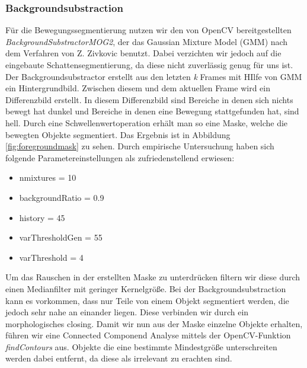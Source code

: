 \documentclass[conference]{IEEEtran}
\begin{document}
\subsubsection{Backgroundsubstraction}
Für die Bewegungssegmentierung nutzen wir den von OpenCV bereitgestellten \textit{BackgroundSubstractorMOG2}, der das Gaussian Mixture Model (GMM) nach dem Verfahren von Z. Zivkovic \cite{zivkovic} benutzt. Dabei verzichten wir jedoch auf die eingebaute Schattensegmentierung, da diese nicht zuverlässig genug für uns ist. Der Backgroundsubstractor erstellt aus den letzten \textit{k} Frames mit HIlfe von GMM ein Hintergrundbild. Zwischen diesem und dem aktuellen Frame wird ein Differenzbild erstellt. In diesem Differenzbild sind Bereiche in denen sich nichts bewegt hat dunkel und Bereiche in denen eine Bewegung stattgefunden hat, sind hell. Durch eine Schwellenwertoperation erhält man so eine Maske, welche die bewegten Objekte segmentiert. Das Ergebnis ist in Abbildung \ref{fig:foregroundmask} zu sehen.
Durch empirische Untersuchung haben sich folgende Parametereinstellungen als zufriedenstellend erwiesen:
\begin{itemize}
	\item nmixtures = 10
	\item backgroundRatio = 0.9
	\item history = 45
	\item varThresholdGen = 55
	\item varThreshold = 4
\end{itemize}
Um das Rauschen in der erstellten Maske zu unterdrücken filtern wir diese durch einen Medianfilter mit geringer Kernelgröße. Bei der Backgroundsubstraction kann es vorkommen, dass nur Teile von einem Objekt segmentiert werden, die jedoch sehr nahe an einander liegen. Diese verbinden wir durch ein morphologisches closing.
Damit wir nun aus der Maske einzelne Objekte erhalten, führen wir eine Connected Componend Analyse mittels der OpenCV-Funktion \textit{findContours} aus. Objekte die eine bestimmte Mindestgröße unterschreiten werden dabei entfernt, da diese als irrelevant zu erachten sind.
\end{document}

